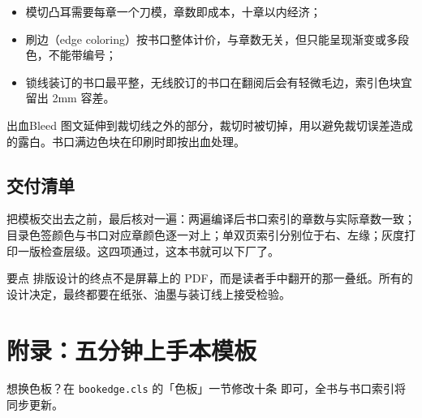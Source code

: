 \documentclass{bookedge}
\begin{document}
\begin{itemize}
  \item 模切凸耳需要每章一个刀模，章数即成本，十章以内经济；
  \item 刷边（edge coloring）按书口整体计价，与章数无关，但只能呈现渐变或多段色，不能带编号；
  \item 锁线装订的书口最平整，无线胶订的书口在翻阅后会有轻微毛边，索引色块宜留出 2mm 容差。
\end{itemize}

\begin{entry}{出血}{Bleed}
图文延伸到裁切线之外的部分，裁切时被切掉，用以避免裁切误差造成的露白。书口满边色块在印刷时即按出血处理。
\end{entry}

\section{交付清单}

把模板交出去之前，最后核对一遍：两遍编译后书口索引的章数与实际章数一致；目录色签颜色与书口对应章颜色逐一对上；单双页索引分别位于右、左缘；灰度打印一版检查层级。这四项通过，这本书就可以下厂了。

\bigskip
\begin{notebox}{要点}
排版设计的终点不是屏幕上的 PDF，而是读者手中翻开的那一叠纸。所有的设计决定，最终都要在纸张、油墨与装订线上接受检验。
\end{notebox}

\chapter*{附录：五分钟上手本模板}


\bigskip
\noindent 想换色板？在 \texttt{bookedge.cls} 的「色板」一节修改十条 \texttt{\string\definecolor} 即可，全书与书口索引将同步更新。
\end{document}
